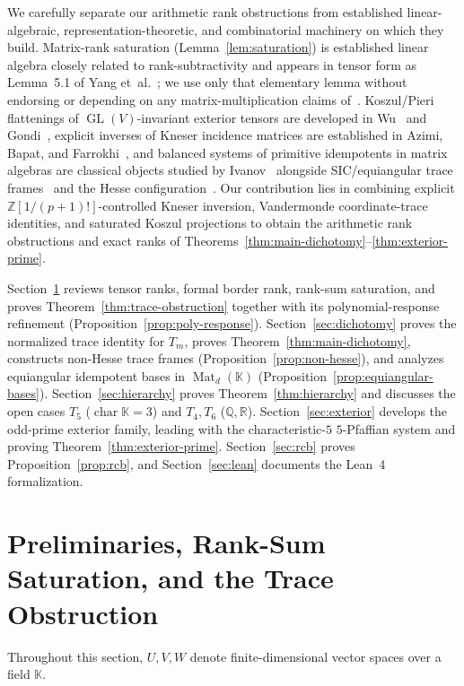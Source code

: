 \documentclass[11pt,reqno]{amsart}
\theoremstyle{definition}
\theoremstyle{remark}
\numberwithin{equation}{section}
\newcommand{\KK}{\mathbb{K}}
\newcommand{\QQ}{\mathbb{Q}}
\newcommand{\RR}{\mathbb{R}}
\newcommand{\ZZ}{\mathbb{Z}}
\DeclareMathOperator{\Mat}{Mat}
\DeclareMathOperator{\GL}{GL}
\DeclareMathOperator{\chr}{char}
\begin{document}
We carefully separate our arithmetic rank obstructions from established linear-algebraic, representation-theoretic, and combinatorial machinery on which they build. Matrix-rank saturation (Lemma~\ref{lem:saturation}) is established linear algebra closely related to rank-subtractivity and appears in tensor form as Lemma~5.1 of Yang et~al.~\cite{Yang2026}; we use only that elementary lemma without endorsing or depending on any matrix-multiplication claims of~\cite{Yang2026}. Koszul/Pieri flattenings of $\GL(V)$-invariant exterior tensors are developed in Wu~\cite{Wu2024} and Gondi~\cite{Gondi2025}, explicit inverses of Kneser incidence matrices are established in Azimi, Bapat, and Farrokhi~\cite{ABF2023}, and balanced systems of primitive idempotents in matrix algebras are classical objects studied by Ivanov~\cite{Ivanov2000} alongside SIC/equiangular trace frames~\cite{GIJM2022FFA,GIJM2022LAA,RBSC2004} and the Hesse configuration~\cite{ArtebaniDolgachev2009}. Our contribution lies in combining explicit $\ZZ[1/(p+1)!]$-controlled Kneser inversion, Vandermonde coordinate-trace identities, and saturated Koszul projections to obtain the arithmetic rank obstructions and exact ranks of Theorems~\ref{thm:main-dichotomy}--\ref{thm:exterior-prime}.

Section~\ref{sec:prelim} reviews tensor ranks, formal border rank, rank-sum saturation, and proves Theorem~\ref{thm:trace-obstruction} together with its polynomial-response refinement (Proposition~\ref{prop:poly-response}). Section~\ref{sec:dichotomy} proves the normalized trace identity for $T_m$, proves Theorem~\ref{thm:main-dichotomy}, constructs non-Hesse trace frames (Proposition~\ref{prop:non-hesse}), and analyzes equiangular idempotent bases in $\Mat_d(\KK)$ (Proposition~\ref{prop:equiangular-bases}). Section~\ref{sec:hierarchy} proves Theorem~\ref{thm:hierarchy} and discusses the open cases $T_5$ ($\chr\KK = 3$) and $T_4, T_6$ ($\QQ, \RR$). Section~\ref{sec:exterior} develops the odd-prime exterior family, leading with the characteristic-$5$ $5$-Pfaffian system and proving Theorem~\ref{thm:exterior-prime}. Section~\ref{sec:rcb} proves Proposition~\ref{prop:rcb}, and Section~\ref{sec:lean} documents the Lean~4 formalization.

\section{Preliminaries, Rank-Sum Saturation, and the Trace Obstruction}\label{sec:prelim}

Throughout this section, $U, V, W$ denote finite-dimensional vector spaces over a field $\KK$.
\end{document}
